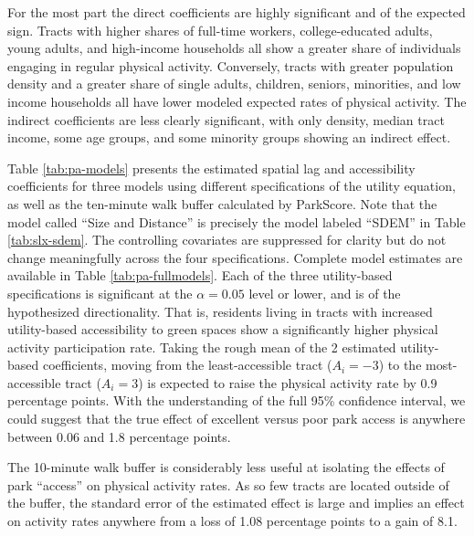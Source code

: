 \documentclass[shortAfour,sageh.bst]{sagej}
\begin{document}
For the most part the direct coefficients are highly significant and of
the expected sign. Tracts with higher shares of full-time workers,
college-educated adults, young adults, and high-income households all
show a greater share of individuals engaging in regular physical
activity. Conversely, tracts with greater population density and a
greater share of single adults, children, seniors, minorities, and low
income households all have lower modeled expected rates of physical
activity. The indirect coefficients are less clearly significant, with
only density, median tract income, some age groups, and some minority
groups showing an indirect effect.

Table \ref{tab:pa-models} presents the estimated spatial lag and
accessibility coefficients for three models using different
specifications of the utility equation, as well as the ten-minute walk
buffer calculated by ParkScore. Note that the model called ``Size and
Distance'' is precisely the model labeled ``SDEM'' in Table
\ref{tab:slx-sdem}. The controlling covariates are suppressed for
clarity but do not change meaningfully across the four specifications.
Complete model estimates are available in Table \ref{tab:pa-fullmodels}. Each of the
three utility-based specifications is significant at the
\(\alpha = 0.05\) level or lower, and is of the hypothesized
directionality. That is, residents living in tracts with increased
utility-based accessibility to green spaces show a significantly higher
physical activity participation rate. Taking the rough mean of the 2
estimated utility-based coefficients, moving from the least-accessible
tract (\(A_i = -3\)) to the most-accessible tract (\(A_i = 3\)) is
expected to raise the physical activity rate by 0.9 percentage points.
With the understanding of the full 95\% confidence interval, we could
suggest that the true effect of excellent versus poor park access is
anywhere between 0.06 and 1.8 percentage points.

The 10-minute walk buffer is considerably less useful at isolating the
effects of park ``access'' on physical activity rates. As so few tracts
are located outside of the buffer, the standard error of the estimated
effect is large and implies an effect on activity rates anywhere from a
loss of 1.08 percentage points to a gain of 8.1.
\end{document}
